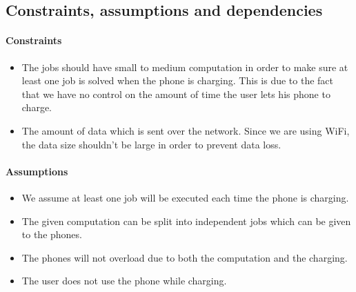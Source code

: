 \documentclass[a4paper,10pt]{article}
\begin{document}


\subsection{Constraints, assumptions and dependencies}
\paragraph{Constraints}
\begin{itemize}
	\item The jobs should have small to medium computation in order to make sure at least one job is solved when the phone is charging. This is due to the fact that we have no control on the amount of time the user lets his phone to charge.

	\item The amount of data which is sent over the network. Since we are using WiFi, the data size shouldn’t be large in order to prevent data loss.
\end{itemize} 

\paragraph{Assumptions}
\begin{itemize}
	\item We assume at least one job will be executed each time the phone is charging. 
	\item The given computation can be split into independent jobs which can be given to the phones.
	\item The phones will not overload due to both the computation and the charging.
	\item The user does not use the phone while charging.
\end{itemize} 
\end{document}
